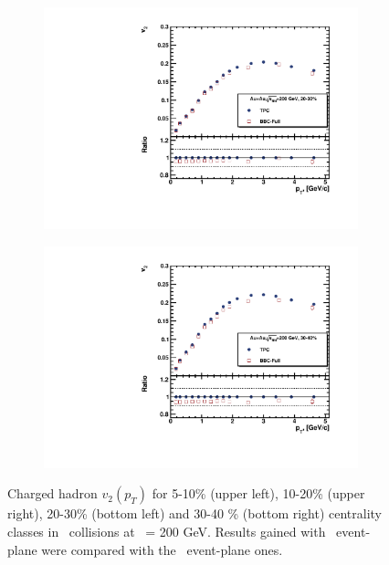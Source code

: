 \begin{figure}[ht]
    \begin{subfigure}{.49\textwidth}
        \centering
        \includegraphics[width=1.\linewidth]{Figures/v2_CH_BBC_pt_cent3.pdf}
    \end{subfigure}
    \begin{subfigure}{.49\textwidth}
        \centering
        \includegraphics[width=1.\linewidth]{Figures/v2_CH_BBC_pt_cent4.pdf}
    \end{subfigure}
    \label{fig:v2_BBC_CH}
    \caption{Charged hadron $v_2(p_T)$ for 5-10\% (upper left), 10-20\% (upper right), 20-30\% (bottom left) and 30-40 \% (bottom right) centrality classes in \AuAu\ collisions at \sNN\ = 200 GeV. Results gained with \BBC\ event-plane were compared with the \TPC\ event-plane ones.}
\end{figure}

